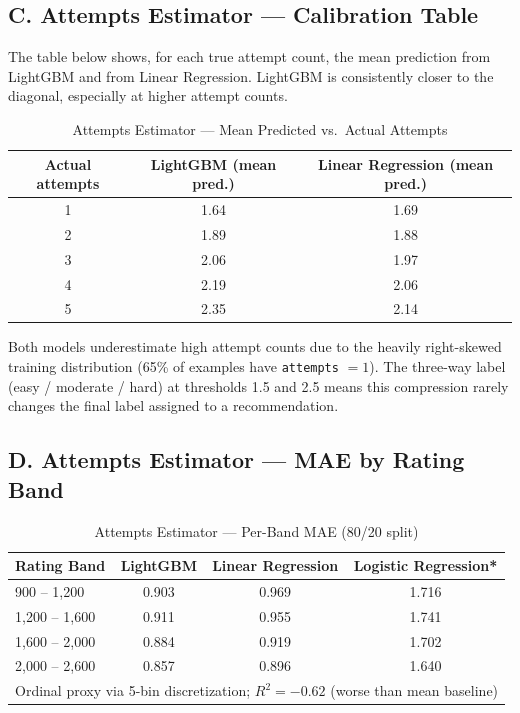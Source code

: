 \documentclass[12pt,a4paper]{article}
\begin{document}
\subsection*{C. Attempts Estimator — Calibration Table}
 
The table below shows, for each true attempt count, the mean prediction
from LightGBM and from Linear Regression. LightGBM is consistently
closer to the diagonal, especially at higher attempt counts.
 
\begin{table}[H]
\centering
\caption{Attempts Estimator — Mean Predicted vs.\ Actual Attempts}
\begin{tabular}{|c|c|c|}
\hline
\textbf{Actual attempts} & \textbf{LightGBM (mean pred.)} & \textbf{Linear Regression (mean pred.)} \\
\hline
1 & 1.64 & 1.69 \\
2 & 1.89 & 1.88 \\
3 & 2.06 & 1.97 \\
4 & 2.19 & 2.06 \\
5 & 2.35 & 2.14 \\
\hline
\end{tabular}
\end{table}
 
Both models underestimate high attempt counts due to the heavily right-skewed
training distribution (65\% of examples have \texttt{attempts} $= 1$). The
three-way label (easy / moderate / hard) at thresholds 1.5 and 2.5 means this
compression rarely changes the final label assigned to a recommendation.
 
\subsection*{D. Attempts Estimator — MAE by Rating Band}
 
\begin{table}[H]
\centering
\caption{Attempts Estimator — Per-Band MAE (80/20 split)}
\begin{tabular}{|l|c|c|c|}
\hline
\textbf{Rating Band} & \textbf{LightGBM} & \textbf{Linear Regression} & \textbf{Logistic Regression*} \\
\hline
900 – 1{,}200  & 0.903 & 0.969 & 1.716 \\
1{,}200 – 1{,}600 & 0.911 & 0.955 & 1.741 \\
1{,}600 – 2{,}000 & 0.884 & 0.919 & 1.702 \\
2{,}000 – 2{,}600 & 0.857 & 0.896 & 1.640 \\
\hline
\multicolumn{4}{l}{\small * Ordinal proxy via 5-bin discretization; $R^2 = -0.62$ (worse than mean baseline)} \\
\end{tabular}
\end{table}
 
\end{document}
